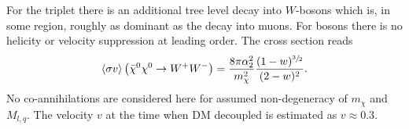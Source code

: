 For the triplet there is an additional tree level decay into $W$-bosons which is, in some region, roughly as dominant as the decay into muons. 
For bosons there is no helicity or velocity suppression at leading order. The cross section reads\cite{1401.6212}
\begin{align}
 \langle \sigma v \rangle \left(\bar \chi^0 \chi^0 \rightarrow W^+W^-\right) = \frac{8\pi \alpha_2^2}{m_\chi^2} \frac{(1-w)^{\sfrac32}}{(2-w)^2}.
\end{align}
No co-annihilations are considered here for assumed non-degeneracy of $m_\chi$ and $M_{l,q}$. The velocity $v$ at the time when DM decoupled is
estimated as $v\approx 0.3$. 
